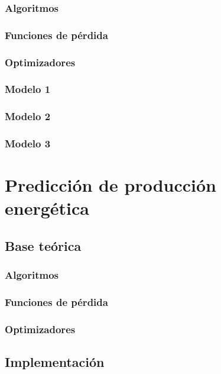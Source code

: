 \documentclass[a4paper,12pt]{article}
\begin{document}
\subsubsection{Algoritmos}

\subsubsection{Funciones de pérdida}

\subsubsection{Optimizadores}

\subsubsection{Modelo 1}

\subsubsection{Modelo 2}

\subsubsection{Modelo 3}

\section{Predicción de producción energética}

\subsection{Base teórica}

\subsubsection{Algoritmos}

\subsubsection{Funciones de pérdida}

\subsubsection{Optimizadores}

\subsection{Implementación}
\end{document}
